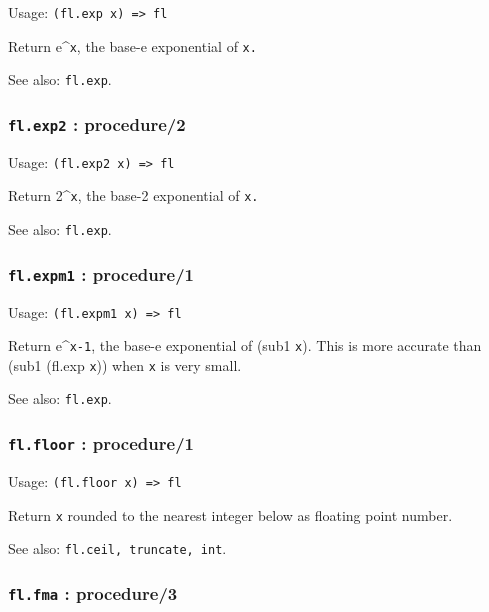 \documentclass[
]{article}
\newcommand{\passthrough}[1]{#1}
\begin{document}
Usage: \passthrough{\lstinline!(fl.exp x) => fl!}

Return e\^{}\passthrough{\lstinline!x!}, the base-e exponential of
\passthrough{\lstinline!x.!}

See also: \passthrough{\lstinline!fl.exp!}.

\hypertarget{fl.exp2-procedure2}{%
\subsubsection{\texorpdfstring{\texttt{fl.exp2} :
procedure/2}{fl.exp2 : procedure/2}}\label{fl.exp2-procedure2}}

Usage: \passthrough{\lstinline!(fl.exp2 x) => fl!}

Return 2\^{}\passthrough{\lstinline!x!}, the base-2 exponential of
\passthrough{\lstinline!x.!}

See also: \passthrough{\lstinline!fl.exp!}.

\hypertarget{fl.expm1-procedure1}{%
\subsubsection{\texorpdfstring{\texttt{fl.expm1} :
procedure/1}{fl.expm1 : procedure/1}}\label{fl.expm1-procedure1}}

Usage: \passthrough{\lstinline!(fl.expm1 x) => fl!}

Return e\^{}\passthrough{\lstinline!x-1!}, the base-e exponential of
(sub1 \passthrough{\lstinline!x!}). This is more accurate than (sub1
(fl.exp \passthrough{\lstinline!x!})) when \passthrough{\lstinline!x!}
is very small.

See also: \passthrough{\lstinline!fl.exp!}.

\hypertarget{fl.floor-procedure1}{%
\subsubsection{\texorpdfstring{\texttt{fl.floor} :
procedure/1}{fl.floor : procedure/1}}\label{fl.floor-procedure1}}

Usage: \passthrough{\lstinline!(fl.floor x) => fl!}

Return \passthrough{\lstinline!x!} rounded to the nearest integer below
as floating point number.

See also: \passthrough{\lstinline!fl.ceil, truncate, int!}.

\hypertarget{fl.fma-procedure3}{%
\subsubsection{\texorpdfstring{\texttt{fl.fma} :
procedure/3}{fl.fma : procedure/3}}\label{fl.fma-procedure3}}
\end{document}
